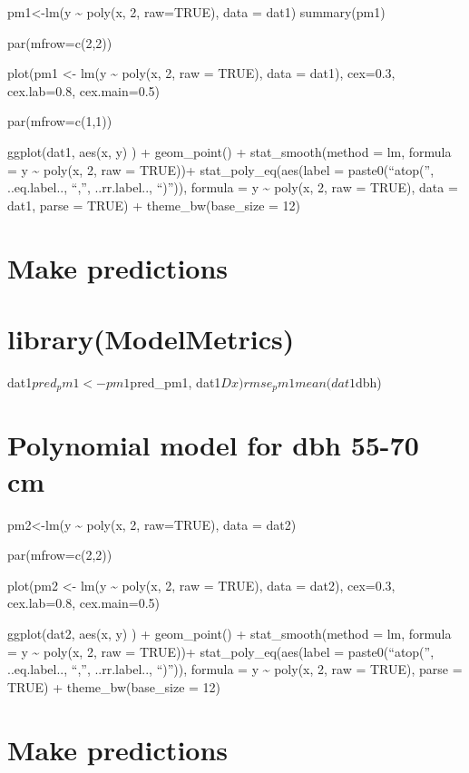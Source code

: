 \documentclass[
]{article}
\begin{document}
pm1\textless-lm(y \textasciitilde{} poly(x, 2, raw=TRUE), data = dat1)
summary(pm1)

par(mfrow=c(2,2))

plot(pm1 \textless- lm(y \textasciitilde{} poly(x, 2, raw = TRUE), data
= dat1), cex=0.3, cex.lab=0.8, cex.main=0.5)

par(mfrow=c(1,1))

ggplot(dat1, aes(x, y) ) + geom\_point() + stat\_smooth(method = lm,
formula = y \textasciitilde{} poly(x, 2, raw = TRUE))+
stat\_poly\_eq(aes(label = paste0(``atop('', ..eq.label.., ``,'',
..rr.label.., ``)'')), formula = y \textasciitilde{} poly(x, 2, raw =
TRUE), data = dat1, parse = TRUE) + theme\_bw(base\_size = 12)

\hypertarget{make-predictions-3}{%
\section{Make predictions}\label{make-predictions-3}}

\hypertarget{librarymodelmetrics-3}{%
\section{library(ModelMetrics)}\label{librarymodelmetrics-3}}

dat1\(pred_pm1 <- pm1 %
\)pred\_pm1, dat1\(Dx) rmse_pm1 mean(dat1\)dbh)

\hypertarget{polynomial-model-for-dbh-55-70-cm}{%
\section{Polynomial model for dbh 55-70
cm}\label{polynomial-model-for-dbh-55-70-cm}}

pm2\textless-lm(y \textasciitilde{} poly(x, 2, raw=TRUE), data = dat2)

par(mfrow=c(2,2))

plot(pm2 \textless- lm(y \textasciitilde{} poly(x, 2, raw = TRUE), data
= dat2), cex=0.3, cex.lab=0.8, cex.main=0.5)

ggplot(dat2, aes(x, y) ) + geom\_point() + stat\_smooth(method = lm,
formula = y \textasciitilde{} poly(x, 2, raw = TRUE))+
stat\_poly\_eq(aes(label = paste0(``atop('', ..eq.label.., ``,'',
..rr.label.., ``)'')), formula = y \textasciitilde{} poly(x, 2, raw =
TRUE), parse = TRUE) + theme\_bw(base\_size = 12)

\hypertarget{make-predictions-4}{%
\section{Make predictions}\label{make-predictions-4}}
\end{document}
